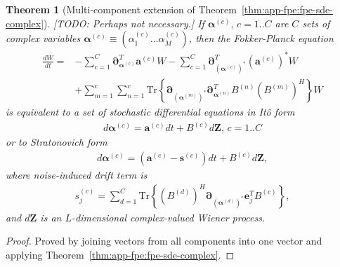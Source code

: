 \documentclass[12pt,aip,jmp,amssymb,amsmath]{revtex4-1}
\newtheorem{theorem}{Theorem}
\begin{document}
\begin{theorem}[Multi-component extension of Theorem~\ref{thm:app-fpe:fpe-sde-complex}]
\label{thm:app-fpe:mc-fpe-sde}
    [TODO: Perhaps not necessary.]
    If $\boldsymbol{\alpha}^{(c)},\, c = 1..C$ are $C$ sets of complex variables $\boldsymbol{\alpha}^{(c)} \equiv (\alpha_1^{(c)} \ldots \alpha_M^{(c)})$, then the Fokker-Planck equation
    \begin{equation}\begin{split}
        \frac{dW}{dt}
        = & - \sum_{c=1}^C \boldsymbol{\partial}_{\boldsymbol{\alpha}^{(c)}}^T \boldsymbol{a}^{(c)} W
        - \sum_{c=1}^C \boldsymbol{\partial}_{(\boldsymbol{\alpha}^{(c)})^*}^T (\boldsymbol{a}^{(c)})^* W \\
        & + \sum_{m=1}^c \sum_{n=1}^c
            \mathrm{Tr} \left\{
                \boldsymbol{\partial}_{(\boldsymbol{\alpha}^{(m)})^*}
                \boldsymbol{\partial}_{\boldsymbol{\alpha}^{(n)}}^T
                B^{(n)} (B^{(m)})^H
            \right\} W
    \end{split}\end{equation}
    is equivalent to a set of stochastic differential equations in It\^{o} form
    \begin{equation}\begin{split}
        d\boldsymbol{\alpha}^{(c)} = \boldsymbol{a}^{(c)} dt + B^{(c)} d\boldsymbol{Z},\, c = 1..C
    \end{split}\end{equation}
    or to Stratonovich form
    \begin{equation*}\begin{split}
        d\boldsymbol{\alpha}^{(c)} = (\boldsymbol{a}^{(c)} - \boldsymbol{s}^{(c)}) dt + B^{(c)} d\boldsymbol{Z},
    \end{split}\end{equation*}
    where noise-induced drift term is
    \begin{equation*}\begin{split}
        s_j^{(c)} = \sum_{d=1}^C
            \mathrm{Tr} \left\{ (B^{(d)})^H \boldsymbol{\partial}_{(\boldsymbol{\alpha}^{(d)})^*} \boldsymbol{e}_j^T B^{(c)} \right\},
    \end{split}\end{equation*}
    and $d\boldsymbol{Z}$ is an $L$-dimensional complex-valued Wiener process.
\end{theorem}
\begin{proof}
Proved by joining vectors from all components into one vector and applying Theorem~\ref{thm:app-fpe:fpe-sde-complex}.
\end{proof}
\end{document}
